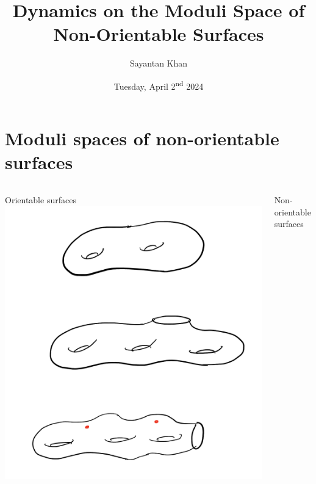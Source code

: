 \documentclass[8pt]{beamer}
\title{Dynamics on the Moduli Space of Non-Orientable Surfaces}
\author[Sayantan Khan]{Sayantan Khan}
\institute{University of Michigan}
\date{Tuesday, April 2\textsuperscript{nd} 2024}
\begin{document}
\begin{frame}
  \titlepage
\end{frame}

\section{Moduli spaces of non-orientable surfaces}

\begin{frame}
\begin{columns}
\begin{column}{0.5\textwidth}
  \begin{center}
    Orientable surfaces \\
    \includegraphics[scale=0.15]{orientable.png}
  \end{center}
\end{column}
\pause
\begin{column}{0.5\textwidth}  %
    \begin{center}
      Non-orientable surfaces

\end{center}
\end{column}
\end{columns}
\end{frame}
\end{document}
